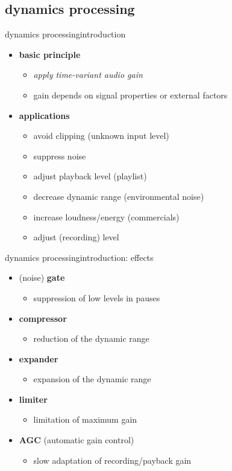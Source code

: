 \subsection{dynamics processing}
\begin{frame}{dynamics processing}{introduction}
	\begin{itemize}
		\item	\textbf{basic principle}
			\begin{itemize}
				\item	\textit{apply time-variant audio gain} 
                \item   gain depends on signal properties or external factors
			\end{itemize}
		\pause
        \bigskip
		\item	\textbf{applications}
			\begin{itemize}
				\item	avoid clipping (unknown input level)
				\item	suppress noise
				\item	adjust playback level (playlist)
				\item	decrease dynamic range (environmental noise)
				\item	increase loudness/energy (commercials)
				\item	adjust (recording) level
			\end{itemize}
	\end{itemize}
\end{frame}
\begin{frame}{dynamics processing}{introduction: effects}
	\begin{itemize}
		\item	(noise) \textbf{gate}
			\begin{itemize}
				\item	suppression of low levels in pauses
			\end{itemize}
		\pause
        \smallskip
		\item	\textbf{compressor}
			\begin{itemize}
				\item	reduction of the dynamic range
			\end{itemize}
		\pause
        \smallskip
		\item	\textbf{expander}
			\begin{itemize}
				\item	expansion of the dynamic range
			\end{itemize}
		\pause
        \smallskip
		\item	\textbf{limiter}
			\begin{itemize}
				\item	limitation of maximum gain
			\end{itemize}
		\pause
        \smallskip
		\item	\textbf{AGC} (automatic gain control)
			\begin{itemize}
				\item	slow adaptation of recording/payback gain
			\end{itemize}
	\end{itemize}
\end{frame}

